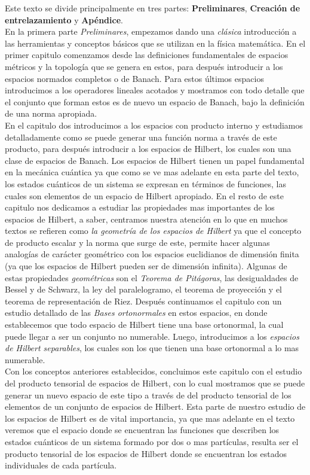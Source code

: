 \documentclass[12pt]{book}
\numberwithin{equation}{chapter}
\begin{document}
Este texto se divide principalmente en tres partes: {\bf Preliminares}, {\bf Creaci\'on de entrelazamiento} y {\bf Ap\'endice}.\\

En la primera parte \emph{Preliminares}, empezamos dando una \emph{cl\'asica} introducci\'on a las herramientas y conceptos b\'asicos que se utilizan en la f\'isica matem\'atica. En el primer capitulo comenzamos desde las definiciones fundamentales de espacios m\'etricos y la topolog\'ia que se genera en estos, para despu\'es introducir a los espacios normados completos o de Banach. Para estos \'ultimos espacios introducimos a los operadores lineales acotados y mostramos con todo detalle que el conjunto que forman estos es de nuevo un espacio de Banach, bajo la definici\'on de una norma apropiada.\\

En el capitulo dos introducimos a los espacios con producto interno y estudiamos detalladamente como se puede generar una funci\'on norma a trav\'es de este producto, para despu\'es introducir a los espacios de Hilbert, los cuales son una clase de espacios de Banach. Los espacios de Hilbert tienen un papel fundamental en la mec\'anica cu\'antica ya que como se ve mas adelante en esta parte del texto, los estados cu\'anticos de un sistema se expresan en t\'erminos de funciones, las cuales son elementos de un espacio de Hilbert apropiado. En el resto de este capitulo nos dedicamos a estudiar las propiedades mas importantes de los espacios de Hilbert, a saber, centramos nuestra atenci\'on en lo que en muchos textos se refieren como \emph{la geometr\'ia de los espacios de Hilbert} ya que el concepto de producto escalar y la norma que surge de este, permite hacer algunas analog\'ias de car\'acter geom\'etrico con los espacios euclidianos de dimensi\'on finita (ya que los espacios de Hilbert pueden ser de dimensi\'on infinita). Algunas de estas propiedades \emph{geom\'etricas} son el \emph{Teorema de Pit\'agoras}, las desigualdades de Bessel y de Schwarz, la ley del paralelogramo, el teorema de proyecci\'on y el teorema de representaci\'on de Riez. Despu\'es continuamos el capitulo con un estudio detallado de las \emph{Bases ortonormales} en estos espacios, en donde establecemos que todo espacio de Hilbert tiene una base ortonormal, la cual puede llegar a ser un conjunto no numerable. Luego, introducimos a los \emph{espacios de Hilbert separables}, los cuales son los que tienen una base ortonormal a lo mas numerable.\\ 
Con los conceptos anteriores establecidos, concluimos este capitulo con el estudio del  producto tensorial de espacios de Hilbert, con lo cual mostramos que se puede generar un nuevo espacio de este tipo a trav\'es de del producto tensorial de los elementos de un conjunto de espacios de Hilbert. Esta parte de nuestro estudio de los espacios de Hilbert es de vital importancia, ya que mas adelante en el texto veremos que el espacio donde se encuentran las funciones que describen los estados cu\'anticos de un sistema formado por dos o mas part\'iculas, resulta ser el producto tensorial de los espacios de Hilbert donde se encuentran los estados individuales de cada part\'icula.\\
\end{document}
